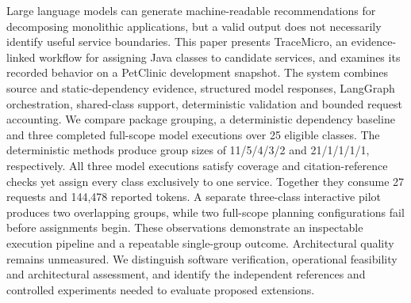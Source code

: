 Large language models can generate machine-readable recommendations for decomposing monolithic applications, but a valid output does not necessarily identify useful service boundaries. This paper presents TraceMicro, an evidence-linked workflow for assigning Java classes to candidate services, and examines its recorded behavior on a PetClinic development snapshot. The system combines source and static-dependency evidence, structured model responses, LangGraph orchestration, shared-class support, deterministic validation and bounded request accounting. We compare package grouping, a deterministic dependency baseline and three completed full-scope model executions over 25 eligible classes. The deterministic methods produce group sizes of 11/5/4/3/2 and 21/1/1/1/1, respectively. All three model executions satisfy coverage and citation-reference checks yet assign every class exclusively to one service. Together they consume 27 requests and 144,478 reported tokens. A separate three-class interactive pilot produces two overlapping groups, while two full-scope planning configurations fail before assignments begin. These observations demonstrate an inspectable execution pipeline and a repeatable single-group outcome. Architectural quality remains unmeasured. We distinguish software verification, operational feasibility and architectural assessment, and identify the independent references and controlled experiments needed to evaluate proposed extensions.
